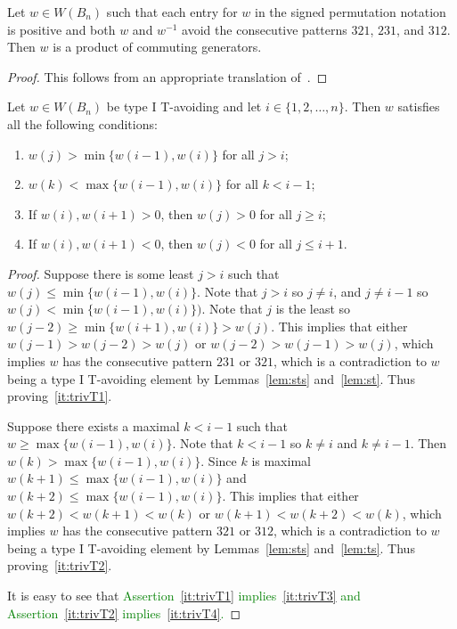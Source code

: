 \begin{lemma}\label{lem:prodofcommA}
Let $w \in W(B_n)$ such that each entry for $w$ in the signed permutation notation is positive and both $w$ and $w^{-1}$ avoid the consecutive patterns $321$, $231$, and $312$. Then $w$ is a product of commuting generators.
\begin{proof}
	This follows from an appropriate translation of~\cite[Lemma 2.2.9]{Gern2013a}.
\end{proof}	
\end{lemma}

\begin{lemma}\label{lem:prodofCommB}
Let $w \in W(B_n)$ be type I T-avoiding and let $i \in \{1,2, \ldots, n\}$. Then $w$ satisfies all the following conditions:
\begin{enumerate}[leftmargin=2cm]
\item $w(j) > \min\{w(i-1), w(i)\}$ for all $j >i$;\label{it:trivT1}
\item $w(k) < \max\{w(i-1), w(i)\}$ for all $k < i-1$;\label{it:trivT2}
\item If $w(i), w(i+1) > 0$, then $w(j)>0$ for all $j \geq i$;\label{it:trivT3}
\item If $w(i), w(i+1) < 0$, then $w(j)<0$ for all $j \leq i+1$.\label{it:trivT4}
\end{enumerate}
\begin{proof}
	Suppose there is some least $j>i$ such that $w(j) \leq \min\{w(i-1), w(i)\}$. Note that $j>i$ so $j \neq i$, and $j \neq i-1$ so $w(j) < \min\{w(i-1), w(i)\})$. Note that $j$ is the least so $w(j-2) \geq \min\{w(i+1), w(i)\}>w(j)$. This implies that either $w(j-1)>w(j-2)>w(j)$ or $w(j-2)>w(j-1)>w(j)$, which implies $w$ has the consecutive pattern $231$ or $321$, which is a contradiction to $w$ being a type I T-avoiding element by Lemmas~\ref{lem:sts} and~\ref{lem:st}. Thus proving~\ref{it:trivT1}.
	
	Suppose there exists a maximal $k<i-1$ such that $w \geq \max\{w(i-1), w(i)\}$. Note that $k < i-1$ so $k \neq i$ and $k \neq i-1$. Then $w(k)> \max\{w(i-1), w(i)\}$. Since $k$ is maximal $w(k+1) \leq  \max\{w(i-1), w(i)\}$ and $w(k+2) \leq \max\{w(i-1), w(i)\}$. This implies that either $w(k+2)<w(k+1)<w(k)$ or $w(k+1)<w(k+2)<w(k)$, which implies $w$ has the consecutive pattern $321$ or $312$, which is a contradiction to $w$ being a type I T-avoiding element by Lemmas~\ref{lem:sts} and~\ref{lem:ts}. Thus proving~\ref{it:trivT2}.
	
	It is easy to see that \textcolor{green}{Assertion~\ref{it:trivT1} implies~\ref{it:trivT3} and Assertion~\ref{it:trivT2} implies~\ref{it:trivT4}.}
\end{proof}	
\end{lemma}

